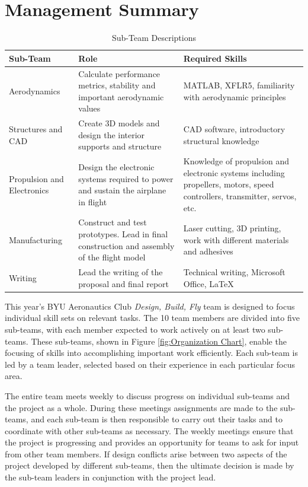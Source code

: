 \documentclass[proposal]{byu-aero}
\begin{document}
\section{Management Summary}
\label{sec:ManagementSummary}

\begin{table}[h!]
	\centering
	\renewcommand*{\arraystretch}{1.1}
	\caption{Sub-Team Descriptions}
	\label{tab:Roles}
	\begin{tabular}{ |m{1.7in}|m{2.5in}|m{2in}| }
		\hline
		\rowcolor{BYUbluemid}
		{Sub-Team} & {Role} & {Required Skills} \\ 
		\hline
		{Aerodynamics} & Calculate performance metrics, stability and important aerodynamic values & MATLAB, XFLR5, familiarity with aerodynamic principles\\
		\hline
		{Structures and CAD} & Create 3D models and design the interior supports and structure & CAD software, introductory structural knowledge\\ 
		\hline
		{Propulsion and Electronics} & Design the electronic systems required to power and sustain the airplane in flight & Knowledge of propulsion and electronic systems including propellers, motors, speed controllers, transmitter, servos, etc. \\ 
		\hline
		{Manufacturing} & Construct and test prototypes. Lead in final construction and assembly of the flight model & Laser cutting, 3D printing, work with different materials and adhesives  \\ 
		\hline
		{Writing} & Lead the writing of the proposal and final report & Technical writing, Microsoft Office, \LaTeX \\
		\hline
	\end{tabular}
\end{table}
This year's BYU Aeronautics Club \textit{Design, Build, Fly} team is designed to focus individual skill sets on relevant tasks. The 10 team members are divided into five sub-teams, with each member expected to work actively on at least two sub-teams. These sub-teams, shown in Figure \ref{fig:Organization Chart}, enable the focusing of skills into accomplishing important work efficiently. Each sub-team is led by a team leader, selected based on their experience in each particular focus area.

The entire team meets weekly to discuss progress on individual sub-teams and the project as a whole. During these meetings assignments are made to the sub-teams, and each sub-team is then responsible to carry out their tasks and to coordinate with other sub-teams as necessary. The weekly meetings ensure that the project is progressing and provides an opportunity for teams to ask for input from other team members. If design conflicts arise between two aspects of the project developed by different sub-teams, then the ultimate decision is made by the sub-team leaders in conjunction with the project lead.
\end{document}
